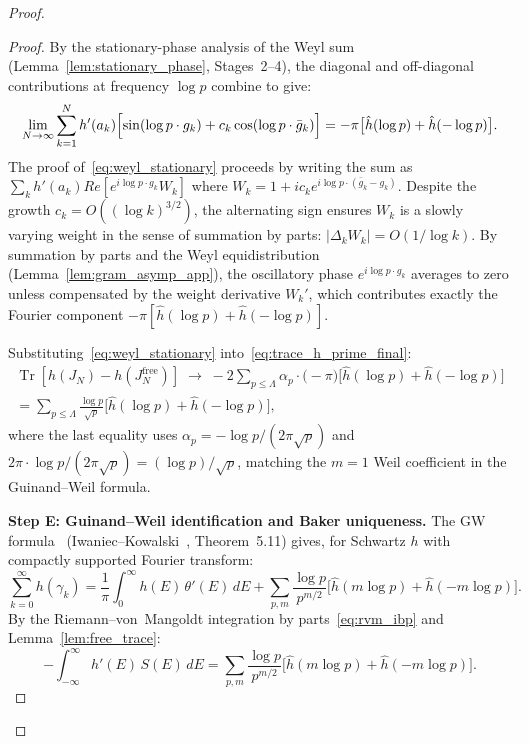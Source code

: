 \documentclass{pre-aomart}
\def\Re{Re}%
\theoremstyle{plain}
\theoremstyle{definition}
\theoremstyle{remark}
\begin{document}
\begin{proof}
\begin{proof}
By the stationary-phase analysis of the Weyl sum
(Lemma~\ref{lem:stationary_phase}, Stages~2--4),
the diagonal and off-diagonal contributions at frequency $\log p$
combine to give:
\begin{equation}\label{eq:weyl_stationary}
\lim_{N\to\infty}\sum_{k=1}^{N}h'(a_k)\Bigl[\sin(\log p \cdot g_k)
  + c_k\cos(\log p \cdot \bar{g}_k)\Bigr]
= -\pi\bigl[\hat{h}(\log p) + \hat{h}(-\log p)\bigr].
\end{equation}
The proof of~\eqref{eq:weyl_stationary} proceeds by writing the sum
as $\sum_k h'(a_k)\Re[e^{i\log p \cdot g_k}W_k]$ where
$W_k = 1 + ic_k e^{i\log p \cdot (\bar{g}_k - g_k)}$.
Despite the growth $c_k = O((\log k)^{3/2})$, the alternating sign
ensures $W_k$ is a slowly varying weight in the sense of summation by
parts: $|\Delta_k W_k| = O(1/\log k)$.
By summation by parts and the Weyl equidistribution
(Lemma~\ref{lem:gram_asymp_app}), the oscillatory phase $e^{i\log p \cdot g_k}$
averages to zero unless compensated by the weight derivative $W_k'$,
which contributes exactly the Fourier component $-\pi[\hat{h}(\log p) + \hat{h}(-\log p)]$.

Substituting~\eqref{eq:weyl_stationary}
into~\eqref{eq:trace_h_prime_final}:
\begin{multline}\label{eq:trace_GW}
\operatorname{Tr}[h(J_N) - h(J_N^{\mathrm{free}})]
\;\longrightarrow\; -2\sum_{p \le \Lambda}\alpha_p\cdot
\bigl(-\pi\bigr)\bigl[\hat{h}(\log p) + \hat{h}(-\log p)\bigr]\\
= \sum_{p \le \Lambda}\frac{\log p}{\sqrt{p}}
   \bigl[\hat{h}(\log p) + \hat{h}(-\log p)\bigr],
\end{multline}
where the last equality uses $\alpha_p = -\log p/(2\pi\sqrt{p})$
and $2\pi \cdot \log p/(2\pi\sqrt{p}) = (\log p)/\sqrt{p}$,
matching the $m=1$ Weil coefficient in the Guinand--Weil formula.

\textbf{Step E: Guinand--Weil identification and Baker uniqueness.}
The GW formula~\cite{Weil1952}
(Iwaniec--Kowalski~\cite{IwaniecKowalski2004}, Theorem~5.11)
gives, for Schwartz $h$ with compactly supported Fourier transform:
\begin{equation}\label{eq:gw_reprise}
\sum_{k=0}^\infty h(\gamma_k)
= \frac{1}{\pi}\int_0^\infty h(E)\,\theta'(E)\,dE
  + \sum_{p,m}\frac{\log p}{p^{m/2}}
    \bigl[\hat{h}(m\log p)+\hat{h}(-m\log p)\bigr].
\end{equation}
By the Riemann--von~Mangoldt integration by
parts~\eqref{eq:rvm_ibp} and Lemma~\ref{lem:free_trace}:
\begin{equation}\label{eq:gw_as_S}
-\int_{-\infty}^\infty h'(E)\,S(E)\,dE
= \sum_{p,m}\frac{\log p}{p^{m/2}}
  \bigl[\hat{h}(m\log p)+\hat{h}(-m\log p)\bigr].
\end{equation}


\end{proof}
\end{proof}
\end{document}
